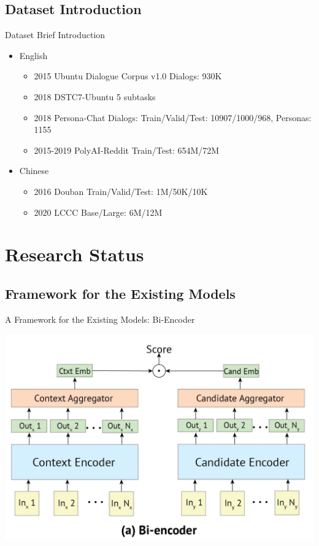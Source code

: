 \documentclass{beamer}
\begin{document}
\subsection{Dataset Introduction}
\begin{frame}{Dataset Brief Introduction}
    \begin{itemize}
        \item English
        \begin{itemize}
            \item 2015 Ubuntu Dialogue Corpus v1.0 Dialogs: 930K
            \item 2018 DSTC7-Ubuntu 5 subtasks
            \item 2018 Persona-Chat  Dialogs: Train/Valid/Test: 10907/1000/968, Personas: 1155
            \item 2015-2019 PolyAI-Reddit Train/Test: 654M/72M
        \end{itemize}
        \item Chinese
        \begin{itemize}
            \item 2016 Douban Train/Valid/Test: 1M/50K/10K
            \item 2020 LCCC Base/Large: 6M/12M
        \end{itemize}

    \end{itemize}
\end{frame}


\section{Research Status}

\subsection{Framework for the Existing Models}


\begin{frame}{A Framework for the Existing Models: Bi-Encoder}
     \begin{center}
    \includegraphics[width=0.9\linewidth]{Bi-encoder.png}
     \end{center}
\end{frame}
\end{document}
